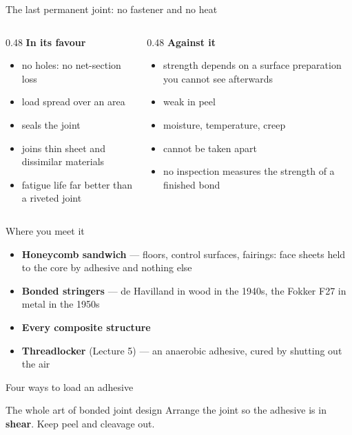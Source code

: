 \documentclass[aspectratio=169,10pt]{beamer}
\begin{document}
\begin{frame}{The last permanent joint: no fastener and no heat}
\begin{columns}[T]
\begin{column}{0.48\textwidth}
\textbf{In its favour}
\begin{itemize}
  \item no holes: no net-section loss
  \item load spread over an area
  \item seals the joint
  \item joins thin sheet and dissimilar materials
  \item fatigue life far better than a riveted joint
\end{itemize}
\end{column}
\begin{column}{0.48\textwidth}
\textbf{Against it}
\begin{itemize}
  \item strength depends on a surface preparation you cannot see afterwards
  \item weak in peel
  \item moisture, temperature, creep
  \item cannot be taken apart
  \item \alert{no inspection measures the strength of a finished bond}
\end{itemize}
\end{column}
\end{columns}
\end{frame}

\begin{frame}{Where you meet it}
\begin{itemize}
  \item \textbf{Honeycomb sandwich} --- floors, control surfaces, fairings: face sheets held to the
        core by adhesive and nothing else
  \item \textbf{Bonded stringers} --- de Havilland in wood in the 1940s, the Fokker F27 in metal in the 1950s
  \item \textbf{Every composite structure}
  \item \textbf{Threadlocker} (Lecture 5) --- an anaerobic adhesive, cured by shutting out the air
\end{itemize}
\end{frame}

\begin{frame}{Four ways to load an adhesive}
\centering
\resizebox{0.95\textwidth}{!}{}

\vfill
\begin{block}{The whole art of bonded joint design}
Arrange the joint so the adhesive is in \textbf{shear}. Keep peel and cleavage out.
\end{block}
\end{frame}
\end{document}
